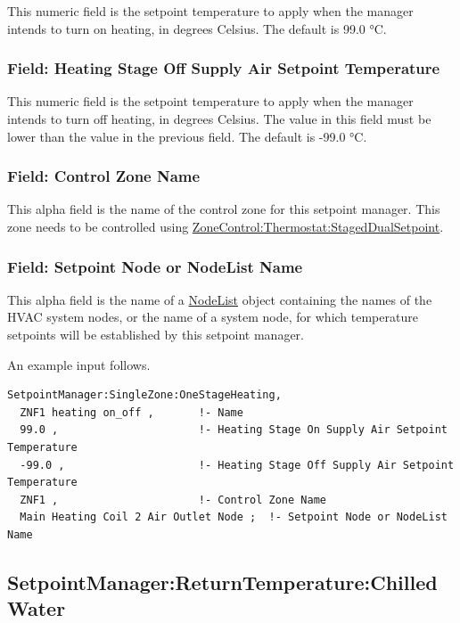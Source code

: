 This numeric field is the setpoint temperature to apply when the manager intends to turn on heating, in degrees Celsius. The default is 99.0 °C.

\subsubsection{Field: Heating Stage Off Supply Air Setpoint Temperature}\label{field-heating-stage-off-supply-air-setpoint-temperature}

This numeric field is the setpoint temperature to apply when the manager intends to turn off heating, in degrees Celsius. The value in this field must be lower than the value in the previous field. The default is -99.0 °C.

\subsubsection{Field: Control Zone Name}\label{field-control-zone-name-4}

This alpha field is the name of the control zone for this setpoint manager. This zone needs to be controlled using \hyperref[zonecontrolthermostatstageddualsetpoint]{ZoneControl:Thermostat:StagedDualSetpoint}.

\subsubsection{Field: Setpoint Node or NodeList Name}\label{field-setpoint-node-or-nodelist-name-21}

This alpha field is the name of a \hyperref[nodelist]{NodeList} object containing the names of the HVAC system nodes, or the name of a system node, for which temperature setpoints will be established by this setpoint manager.

An example input follows.

\begin{lstlisting}
SetpointManager:SingleZone:OneStageHeating,
  ZNF1 heating on_off ,       !- Name
  99.0 ,                      !- Heating Stage On Supply Air Setpoint Temperature
  -99.0 ,                     !- Heating Stage Off Supply Air Setpoint Temperature
  ZNF1 ,                      !- Control Zone Name
  Main Heating Coil 2 Air Outlet Node ;  !- Setpoint Node or NodeList Name
\end{lstlisting}

\subsection{SetpointManager:ReturnTemperature:ChilledWater}\label{setpointmanagerreturntemperaturechilledwater}

